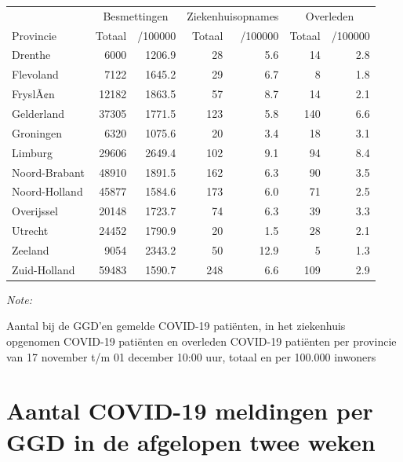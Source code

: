 \documentclass[
  english,
  man,floatsintext]{apa6}
\begin{document}
\begin{table}
\centering
\begin{threeparttable}
\begin{tabular}{lrrrrrr}
\toprule
\multicolumn{1}{c}{ } & \multicolumn{2}{c}{Besmettingen} & \multicolumn{2}{c}{Ziekenhuisopnames} & \multicolumn{2}{c}{Overleden} \\
\cmidrule(l{3pt}r{3pt}){2-3} \cmidrule(l{3pt}r{3pt}){4-5} \cmidrule(l{3pt}r{3pt}){6-7}
Provincie & Totaal & /100000 & Totaal & /100000 & Totaal & /100000\\
\midrule
Drenthe & 6000 & 1206.9 & 28 & 5.6 & 14 & 2.8\\
Flevoland & 7122 & 1645.2 & 29 & 6.7 & 8 & 1.8\\
FryslÃ¢n & 12182 & 1863.5 & 57 & 8.7 & 14 & 2.1\\
Gelderland & 37305 & 1771.5 & 123 & 5.8 & 140 & 6.6\\
Groningen & 6320 & 1075.6 & 20 & 3.4 & 18 & 3.1\\
Limburg & 29606 & 2649.4 & 102 & 9.1 & 94 & 8.4\\
Noord-Brabant & 48910 & 1891.5 & 162 & 6.3 & 90 & 3.5\\
Noord-Holland & 45877 & 1584.6 & 173 & 6.0 & 71 & 2.5\\
Overijssel & 20148 & 1723.7 & 74 & 6.3 & 39 & 3.3\\
Utrecht & 24452 & 1790.9 & 20 & 1.5 & 28 & 2.1\\
Zeeland & 9054 & 2343.2 & 50 & 12.9 & 5 & 1.3\\
Zuid-Holland & 59483 & 1590.7 & 248 & 6.6 & 109 & 2.9\\
\bottomrule
\end{tabular}
\begin{tablenotes}
\item \textit{Note: } 
\item Aantal bij de GGD’en gemelde COVID-19 patiënten, in het ziekenhuis opgenomen COVID-19 patiënten en overleden COVID-19 patiënten per provincie van 17 november t/m 01 december 10:00 uur, totaal en per 100.000 inwoners
\end{tablenotes}
\end{threeparttable}
\end{table}

\newpage

\hypertarget{aantal-covid-19-meldingen-per-ggd-in-de-afgelopen-twee-weken}{%
\section{Aantal COVID-19 meldingen per GGD in de afgelopen twee weken}\label{aantal-covid-19-meldingen-per-ggd-in-de-afgelopen-twee-weken}}
\end{document}
